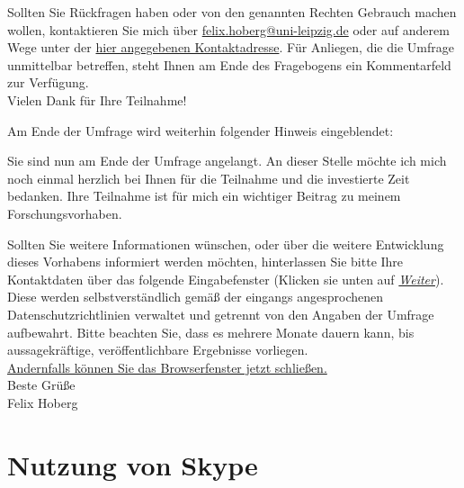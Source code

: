\begin{framed}
Sollten Sie Rückfragen haben oder von den genannten Rechten Gebrauch machen wollen, kontaktieren Sie mich über \href{mailto:felix.hoberg@uni-leipzig.de}{felix.hoberg@uni-leipzig.de} oder auf anderem Wege unter der \href{https://ialt.philol.uni-leipzig.de/institut/kontakte/felix-hoberg/}{hier angegebenen Kontaktadresse}. Für Anliegen, die die Umfrage unmittelbar betreffen, steht Ihnen am Ende des Fragebogens ein Kommentarfeld zur Verfügung.\\

\noindent Vielen Dank für Ihre Teilnahme!
\end{framed}




Am Ende der Umfrage wird weiterhin folgender Hinweis eingeblendet:

\begin{framed}\label{App1:HinweisEnde}

\noindent Sie sind nun am Ende der Umfrage angelangt. An dieser Stelle möchte ich mich noch einmal herzlich bei Ihnen für die Teilnahme und die investierte Zeit bedanken. Ihre Teilnahme ist für mich ein wichtiger Beitrag zu meinem Forschungsvorhaben.

Sollten Sie weitere Informationen wünschen, oder über die weitere Entwicklung dieses Vorhabens informiert werden möchten, hinterlassen Sie bitte Ihre Kontaktdaten über das folgende Eingabefenster (Klicken sie unten auf \textit{\underline{Weiter}}). Diese werden selbstverständlich gemäß der eingangs angesprochenen Datenschutzrichtlinien verwaltet und getrennt von den Angaben der Umfrage aufbewahrt. Bitte beachten Sie, dass es mehrere Monate dauern kann, bis aussagekräftige, veröffentlichbare Ergebnisse vorliegen.\\

\underline{Andernfalls können Sie das Browserfenster jetzt schließen.}\\


\noindent Beste Grüße\\

\noindent Felix Hoberg
\end{framed}

%
%
%
\label{App1:BeginnFragebogen}


\section*{Nutzung von Skype}

